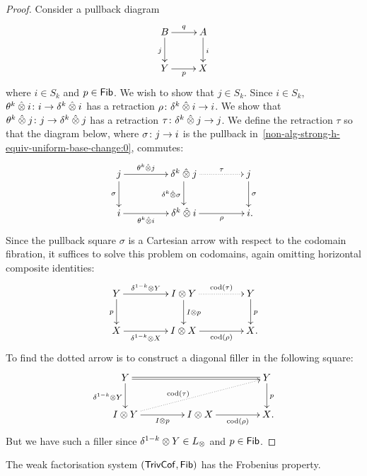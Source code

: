 \documentclass[reqno,10pt,a4paper,oneside,draft]{amsart}
\begin{document}
{{\begin{proof} Consider a pullback diagram
\begin{equation}
\label{non-alg-strong-h-equiv-uniform-base-change:0}
\begin{gathered}
\xymatrix{
 B \ar[d]_j \ar[r]^q & A \ar[d]^i \\ 
Y \ar[r]_p & X }
\end{gathered}
\end{equation}
where $i  \in S_k$ and $p \in \mathsf{Fib}$. We wish to show that $j \in  S_k$. Since $i \in S_k$, $\theta^k \mathbin{\hat{\otimes}} i \colon i \to \delta^k \mathbin{\hat{\otimes}} i$ has a retraction $\rho \colon \delta^k \mathbin{\hat{\otimes}} i \to i$.  We show that $\theta^k \mathbin{\hat{\otimes}} j \colon j \to \delta^k \mathbin{\hat{\otimes}} j$ has a retraction 
$\tau \colon  \delta^k \mathbin{\hat{\otimes}} j \to j$. We define the retraction $\tau$ so that the diagram below, where $\sigma \colon j \to i$ is 
the pullback in~\eqref{non-alg-strong-h-equiv-uniform-base-change:0}, commutes:
\[
\xymatrix@C+2em{
j 
  \ar[r]^-{\thetak \hatotimes j}
  \ar[d]_{\sigma}
&
  \kcyl \hatotimes j 
  \ar@{.>}[r]^-{\tau}
  \ar[d]_{\kcyl \hatotimes \sigma}
&
 j 
  \ar[d]^{\sigma}
\\
  i
  \ar[r]_-{\thetak \hatotimes i}
&
  \kcyl \hatotimes i
  \ar[r]_-{\rho}
&
  i
\rlap{.}}
\]
Since the pullback square $\sigma$ is a Cartesian arrow with respect to the codomain fibration, it suffices to solve this problem on codomains, again omitting horizontal composite identities:
\[
\xymatrix@C+2em{
  Y
  \ar[r]^-{\kcylinv \otimes Y}
  \ar[d]_{p}
&
  \interval \otimes Y
  \ar@{.>}[r]^-{\cod(\tau)}
  \ar[d]^{\interval \otimes p}
&
  Y
  \ar[d]^{p}
\\
  X
  \ar[r]_-{\kcylinv \otimes X}
&
  \interval \otimes X
  \ar[r]_-{\cod(\rho)}
&
  X
\rlap{.}}
\]
To find the dotted arrow is to construct a diagonal filler in the following square:
\[
\xymatrix@C+2em{
  Y
  \ar@{=}[rr]
  \ar[d]_{\kcylinv \otimes Y}
&&
  Y
  \ar[d]^{p}
\\
  \interval \otimes Y
  \ar[r]_-{I \otimes p}
  \ar@{.>}[urr]^(0.4){\cod(\tau)}
&
  \interval \otimes X
  \ar[r]_-{\cod(\rho)}
&
  X
\rlap{.}}
\]
But we have such a filler since $\delta^{1-k} \otimes Y \in L_\otimes$ and $p \in \mathsf{Fib}$. 
\end{proof} 


\begin{theorem} \label{thm:non-alg-frobenius}
The weak factorisation system $(\mathsf{TrivCof}, \mathsf{Fib})$ has the Frobenius property. 
\end{theorem}

}}
\end{document}
